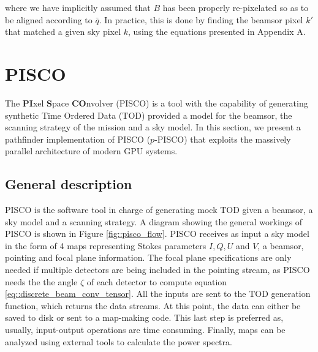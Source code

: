 \documentclass[a4paper,11pt]{article}
\begin{document}
\noindent
where we have implicitly assumed that $B$ has been properly re-pixelated so as to be aligned according to $\bar{q}$. In practice, this is done by finding the beamsor pixel $k'$ that matched a given sky pixel $k$, using the equations presented in Appendix A.

\section{PISCO}

The \textbf{PI}xel \textbf{S}pace \textbf{CO}nvolver (PISCO) is a tool with the capability of generating synthetic Time Ordered Data (TOD) provided a model for the beamsor, the scanning strategy of the mission and a sky model. In this section, we present a pathfinder implementation of PISCO ($p$-PISCO) that exploits the massively parallel architecture of modern GPU systems.

\subsection{General description}

PISCO is the software tool in charge of generating mock TOD given a beamsor, a sky model and a scanning strategy. A diagram showing the general workings of PISCO is shown in Figure \ref{fig::pisco_flow}. PISCO receives as input a sky model in the form of 4 maps representing Stokes parameters $I,Q,U$ and $V$, a beamsor, pointing and focal plane information. The focal plane specifications are only needed if multiple detectors are being included in the pointing stream, as PISCO needs the the angle $\zeta$ of each detector to compute equation \ref{eq::discrete_beam_conv_tensor}. All the inputs are sent to the TOD generation function, which returns the data streams. At this point, the data can either be saved to disk or sent to a map-making code. This last step is preferred as, usually, input-output operations are time consuming. Finally, maps can be analyzed using external tools to calculate the power spectra.
\end{document}

